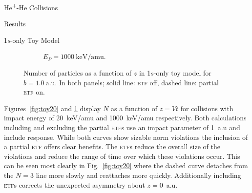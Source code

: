 \documentclass[a5paper, 9 pt]{extreport}
\begin{document}
\begin{chapter}{\texorpdfstring{He\textsuperscript{+}}{He+}-He Collisions \label{chap:hephe}}
\begin{section}{Results \label{sec:hephe-disc}}
\begin{subsection}{1\textit{s}-only Toy Model \label{sec:toy}}
\begin{figure}[t]
\begin{subfigure}{.5\textwidth}
               \caption{$E_P = 1000~\mathrm{keV}/\mathrm{amu}$. \label{fig:toy1000}}
            \end{subfigure}
            \caption[Number of particles as a function of \textit{z} in 1\textit{s}-only toy model]
                    {Number of particles as a function of $z$ in 1$s$-only toy model for $b = 1.0~
                    \mathrm{a.u}$. In both panels; solid line: \textsc{etf} off, dashed line:
                    partial \textsc{etf} on. \label{fig:toy}}
         \end{figure}

         Figures~\ref{fig:toy20} and \ref{fig:toy1000} display $N$ as a function of $z = Vt$ for
         collisions with impact energy of 20~keV/amu and 1000~keV/amu respectively. Both calculations
         including and excluding the partial \textsc{etf}s use an impact parameter of 1~a.u and include
         response. While both curves show sizable norm violations the inclusion of a partial
         \textsc{etf} offers clear benefits. The \textsc{etf}s reduce the overall size of the violations
         and reduce the range of time over which these violations occur. This can be seen most clearly
         in Fig.~\ref{fig:toy20} where the dashed curve detaches from the $N = 3$ line more slowly and
         reattaches more quickly. Additionally including \textsc{etf}s corrects the unexpected asymmetry
         about $z = 0$~a.u.


\end{subsection}
\end{section}
\end{chapter}
\end{document}

